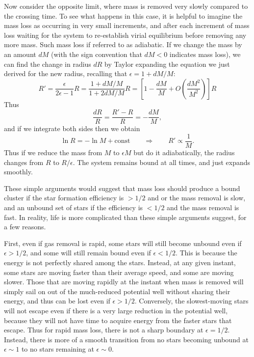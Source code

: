 Now consider the opposite limit, where mass is removed very slowly compared to the crossing time. To see what happens in this case, it is helpful to imagine the mass loss as occurring in very small increments, and after each increment of mass loss waiting for the system to re-establish virial equilibrium before removing any more mass. Such mass loss if referred to as adiabatic. If we change the mass by an amount $dM$ (with the sign convention that $dM < 0$ indicates mass loss), we can find the change in radius $dR$ by Taylor expanding the equation we just derived for the new radius, recalling that $\epsilon = 1 + dM/M$:
\begin{equation}
R' = \frac{\epsilon}{2\epsilon-1} R = \frac{1 + dM/M}{1 + 2 dM/M} R = \left[1 - \frac{dM}{M} + O\left(\frac{dM^2}{M^2}\right)\right] R
\end{equation}
Thus
\begin{equation}
\frac{dR}{R} = \frac{R' - R}{R} = -\frac{dM}{M},
\end{equation}
and if we integrate both sides then we obtain
\begin{equation}
\ln R = -\ln M + \mbox{const} \qquad\Longrightarrow\qquad R' \propto \frac{1}{M}.
\end{equation}
Thus if we reduce the mass from $M$ to $\epsilon M$ but do it adiabatically, the radius changes from $R$ to $R/\epsilon$. The system remains bound at all times, and just expands smoothly.

These simple arguments would suggest that mass loss should produce a bound cluster if the star formation efficiency is $>1/2$ and or the mass removal is slow, and an unbound set of stars if the efficiency is $<1/2$ and the mass removal is fast. In reality, life is more complicated than these simple arguments suggest, for a few reasons.

First, even if gas removal is rapid, some stars will still become unbound even if $\epsilon > 1/2$, and some will still remain bound even if $\epsilon < 1/2$. This is because the energy is not perfectly shared among the stars. Instead, at any given instant, some stars are moving faster than their average speed, and some are moving slower. Those that are moving rapidly at the instant when mass is removed will simply sail on out of the much-reduced potential well without sharing their energy, and thus can be lost even if $\epsilon > 1/2$. Conversely, the slowest-moving stars will not escape even if there is a very large reduction in the potential well, because they will not have time to acquire energy from the faster stars that escape. Thus for rapid mass loss, there is not a sharp boundary at $\epsilon = 1/2$. Instead, there is more of a smooth transition from no stars becoming unbound at $\epsilon \sim 1$ to no stars remaining at $\epsilon \sim 0$.

